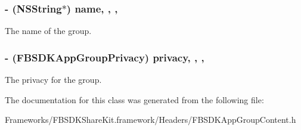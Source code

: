 \subsubsection[{name}]{\setlength{\rightskip}{0pt plus 5cm}-\/ (N\+S\+String$\ast$) name\hspace{0.3cm}{\ttfamily [read]}, {\ttfamily [write]}, {\ttfamily [nonatomic]}, {\ttfamily [copy]}}\label{interface_f_b_s_d_k_app_group_content_a838919b863c4398e13315ec1bae8dd98}
The name of the group. \hypertarget{interface_f_b_s_d_k_app_group_content_a8d405bc64a6c40dfbc5165dc524c37a7}{}
\subsubsection[{privacy}]{\setlength{\rightskip}{0pt plus 5cm}-\/ (F\+B\+S\+D\+K\+App\+Group\+Privacy) privacy\hspace{0.3cm}{\ttfamily [read]}, {\ttfamily [write]}, {\ttfamily [nonatomic]}, {\ttfamily [assign]}}\label{interface_f_b_s_d_k_app_group_content_a8d405bc64a6c40dfbc5165dc524c37a7}
The privacy for the group. 

The documentation for this class was generated from the following file\+:\begin{DoxyCompactItemize}
\item 
Frameworks/\+F\+B\+S\+D\+K\+Share\+Kit.\+framework/\+Headers/F\+B\+S\+D\+K\+App\+Group\+Content.\+h\end{DoxyCompactItemize}
